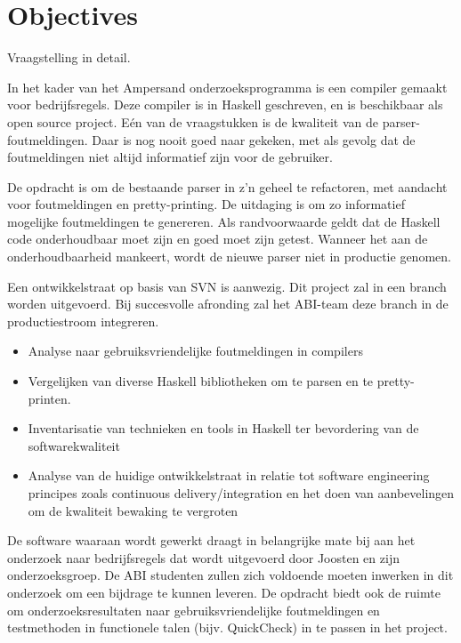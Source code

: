 
\section{Objectives}
Vraagstelling in detail.

In het kader van het Ampersand onderzoeksprogramma is een compiler gemaakt voor bedrijfsregels. Deze compiler is in Haskell geschreven, en is beschikbaar als open source project. Eén van de vraagstukken is de kwaliteit van de parser-foutmeldingen. Daar is nog nooit goed naar gekeken, met als gevolg dat de foutmeldingen niet altijd informatief zijn voor de gebruiker.

De opdracht is om de bestaande parser in z’n geheel te refactoren, met aandacht voor foutmeldingen en pretty-printing. De uitdaging is om zo informatief mogelijke foutmeldingen te genereren. Als randvoorwaarde geldt dat de Haskell code onderhoudbaar moet zijn en goed moet zijn getest. Wanneer het aan de onderhoudbaarheid mankeert, wordt de nieuwe parser niet in productie genomen.

Een ontwikkelstraat op basis van SVN is aanwezig. Dit project zal in een branch worden uitgevoerd. Bij succesvolle afronding zal het ABI-team deze branch in de productiestroom integreren.

\begin{itemize}
\item Analyse naar gebruiksvriendelijke foutmeldingen in compilers 
\item Vergelijken van diverse Haskell bibliotheken om te parsen en te pretty-printen. 
\item Inventarisatie van technieken en tools in Haskell ter bevordering van de software\-kwaliteit 
\item Analyse van de huidige ontwikkelstraat in relatie tot software engineering principes zoals continuous delivery/integration en het doen van aanbevelingen om de kwaliteit bewaking te vergroten 
\end{itemize}

De software waaraan wordt gewerkt draagt in belangrijke mate bij aan het onderzoek naar bedrijfsregels dat wordt uitgevoerd door Joosten en zijn onderzoeksgroep. De ABI studenten zullen zich voldoende moeten inwerken in dit onderzoek om een bijdrage te kunnen leveren. De opdracht biedt ook de ruimte om onderzoeksresultaten naar gebruiksvriendelijke foutmeldingen en testmethoden in functionele talen (bijv. QuickCheck) in te passen in het project.

